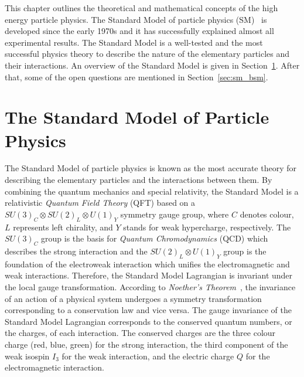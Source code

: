 This chapter outlines the theoretical and mathematical concepts of the high energy particle physics.
The Standard Model of particle physics (SM)~\cite{BF02726525,0029-55826190469-2,PhysRevLett.19.1264,Herrero:1998eq,CBO9780511791406} is developed since the early 1970s and it has successfully explained almost all experimental results.
The Standard Model is a well-tested and the most successful physics theory to describe the nature of the elementary particles and their interactions.
An overview of the Standard Model is given in Section~\ref{sec:sm}.
After that, some of the open questions are mentioned in Section~\ref{sec:sm_bsm}.


\section{The Standard Model of Particle Physics}
\label{sec:sm}
The Standard Model of particle physics is known as the most accurate theory for describing the elementary particles and the interactions between them.
By combining the quantum mechanics and special relativity, the Standard Model is a relativistic \textit{Quantum Field Theory} (QFT) based on a $SU(3)_{C} \otimes SU(2)_{L} \otimes U(1)_{Y}$ symmetry gauge group, where $C$ denotes colour, $L$ represents left chirality, and $Y$ stands for weak hypercharge, respectively.
The $SU(3)_{C}$ group is the basis for \textit{Quantum Chromodynamics} (QCD) which describes the strong interaction and the $SU(2)_{L} \otimes U(1)_{Y}$ group is the foundation of the electroweak interaction which unifies the electromagnetic and weak interactions.
Therefore, the Standard Model Lagrangian is invariant under the local gauge transformation.
According to \textit{Noether's Theorem}~\cite{00411457108231446}, the invariance of an action of a physical system undergoes a symmetry transformation corresponding to a conservation law and vice versa. 
The gauge invariance of the Standard Model Lagrangian corresponds to the conserved quantum numbers, or the charges, of each interaction.
The conserved charges are the three colour charge (red, blue, green) for the strong interaction, the third component of the weak isospin $I_{3}$ for the weak interaction, and the electric charge $Q$ for the electromagnetic interaction.


